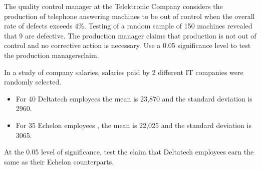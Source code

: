 
 
 \item The quality control manager at the Telektronic Company considers the production of telephone answering machines to be out of control when the overall rate of defects exceeds 4\%.
 Testing of a random sample of 150 machines revealed that 9 are defective. The production manager claims that production is not out of control and no corrective action is necessary. Use a 0.05 significance level to test the production managersclaim.
 
 \item In a study of company salaries, salaries paid by 2 different IT companies were randomly selected.
 
 \begin{itemize}
 \item For 40 Deltatech employees the mean is 23,870 and the standard deviation is 2960.
 \item For 35 Echelon employees , the mean is 22,025 and the standard deviation is 3065.
 \end{itemize}
 
 At the 0.05 level of significance, test the claim that Deltatech employees earn the same as their  Echelon counterparts.
 